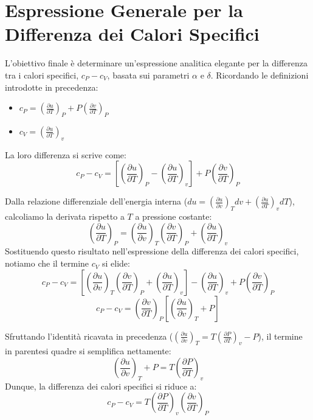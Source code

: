 \section{Espressione Generale per la Differenza dei Calori Specifici}

L'obiettivo finale è determinare un'espressione analitica elegante per la differenza tra i calori specifici, $c_P - c_V$, basata sui parametri $\alpha$ e $\delta$.
Ricordando le definizioni introdotte in precedenza:
\begin{itemize}
\item $c_P = \left(\frac{\partial u}{\partial T}\right)_P + P \left(\frac{\partial v}{\partial T}\right)_P$
\item $c_V = \left(\frac{\partial u}{\partial T}\right)_v$
\end{itemize}
La loro differenza si scrive come:
\begin{equation}
c_P - c_V = \left[ \left(\frac{\partial u}{\partial T}\right)_P - \left(\frac{\partial u}{\partial T}\right)_v \right] + P \left(\frac{\partial v}{\partial T}\right)_P
\end{equation}

Dalla relazione differenziale dell'energia interna ($du = \left(\frac{\partial u}{\partial v}\right)_T dv + \left(\frac{\partial u}{\partial T}\right)_v dT$), calcoliamo la derivata rispetto a $T$ a pressione costante:
\begin{equation}
\left(\frac{\partial u}{\partial T}\right)_P = \left(\frac{\partial u}{\partial v}\right)_T \left(\frac{\partial v}{\partial T}\right)_P + \left(\frac{\partial u}{\partial T}\right)_v
\end{equation}
Sostituendo questo risultato nell'espressione della differenza dei calori specifici, notiamo che il termine $c_V$ si elide:
\begin{equation}
c_P - c_V = \left[ \left(\frac{\partial u}{\partial v}\right)_T \left(\frac{\partial v}{\partial T}\right)_P + \left(\frac{\partial u}{\partial T}\right)_v \right] - \left(\frac{\partial u}{\partial T}\right)_v + P \left(\frac{\partial v}{\partial T}\right)_P
\end{equation}
\begin{equation}
c_P - c_V = \left( \frac{\partial v}{\partial T} \right)_P \left[ \left(\frac{\partial u}{\partial v}\right)_T + P \right]
\end{equation}

Sfruttando l'identità ricavata in precedenza ($\left(\frac{\partial u}{\partial v}\right)_T = T \left(\frac{\partial P}{\partial T}\right)_v - P$), il termine in parentesi quadre si semplifica nettamente:
\begin{equation}
\left(\frac{\partial u}{\partial v}\right)_T + P = T \left(\frac{\partial P}{\partial T}\right)_v
\end{equation}
Dunque, la differenza dei calori specifici si riduce a:
\begin{equation}
c_P - c_V = T \left( \frac{\partial P}{\partial T} \right)_v \left( \frac{\partial v}{\partial T} \right)_P
\end{equation}

